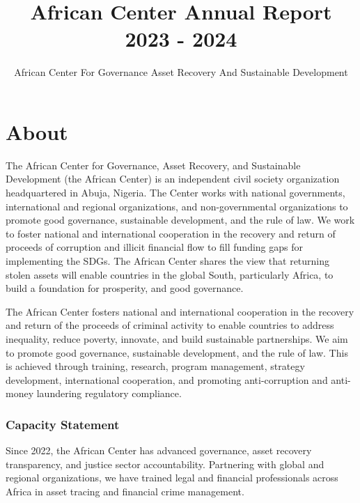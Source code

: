 \documentclass[
  letterpaper,
  DIV=11,
  numbers=noendperiod]{scrreprt}
\title{African Center Annual Report 2023 - 2024}
\subtitle{African Center For Governance Asset Recovery And Sustainable
Development}
\author{}
\date{}
\renewcommand*\contentsname{Table of contents}
\newcommand\contentsname{Table of contents}
\begin{document}
\maketitle

\renewcommand*\contentsname{Table of contents}
{
\hypersetup{linkcolor=}
\setcounter{tocdepth}{4}
\tableofcontents
}


\chapter*{About}\label{about}


\label{hero-heading}

The African Center for Governance, Asset Recovery, and Sustainable
Development (the African Center) is an independent civil society
organization headquartered in Abuja, Nigeria. The Center works with
national governments, international and regional organizations, and
non-governmental organizations to promote good governance, sustainable
development, and the rule of law. We work to foster national and
international cooperation in the recovery and return of proceeds of
corruption and illicit financial flow to fill funding gaps for
implementing the SDGs. The African Center shares the view that returning
stolen assets will enable countries in the global South, particularly
Africa, to build a foundation for prosperity, and good governance.

The African Center fosters national and international cooperation in the
recovery and return of the proceeds of criminal activity to enable
countries to address inequality, reduce poverty, innovate, and build
sustainable partnerships. We aim to promote good governance, sustainable
development, and the rule of law. This is achieved through training,
research, program management, strategy development, international
cooperation, and promoting anti-corruption and anti-money laundering
regulatory compliance.

\subsection*{Capacity Statement}\label{capacity-statement}

Since 2022, the African Center has advanced governance, asset recovery
transparency, and justice sector accountability. Partnering with global
and regional organizations, we have trained legal and financial
professionals across Africa in asset tracing and financial crime
management.
\end{document}

